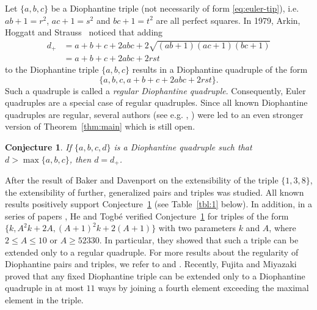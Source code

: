 \documentclass{amsart}
\newtheorem{conjecture}{Conjecture}
\theoremstyle{definition}
\begin{document}
Let $\{a,b,c\}$ be a Diophantine triple (not necessarily of form \eqref{eq:euler-tip}), i.e. $ab+1=r^2$, $ac+1=s^2$ and $bc+1=t^2$ are all perfect squares.
In 1979, Arkin, Hoggatt and Strauss~\cite{Arkin-Hoggatt-Strauss:1979} noticed that adding  
\begin{equation*}
\begin{split}
d_{+}&=a+b+c+2abc+2\sqrt{(ab+1)(ac+1)(bc+1)}\\
& = a+b+c+2abc+2rst
\end{split}
\end{equation*}
 to the Diophantine triple $\{a,b,c\}$ results in a Diophantine quadruple of the form
\begin{equation*}
\{a,b,c, a+b+c+2abc+2rst\}.
\end{equation*} 
Such a quadruple is called a \emph{regular Diophantine quadruple}. Consequently, Euler quadruples are a special case of regular quadruples.
Since all known Diophantine quadruples are regular, several authors (see e.g. \cite{Arkin-Hoggatt-Strauss:1979}, \cite{Dujella-Pethoe:1998})
were led to an even stronger version of Theorem~\ref{thm:main} which is still open.

\begin{conjecture}\label{conj:2}
 If $\{a, b, c, d\}$ is a Diophantine quadruple such that $d > \max\{a, b, c\}$, then $d = d_+$.
\end{conjecture}

 After the result of Baker and Davenport on the extensibility of the triple $\{1,3,8\}$, the extensibility of further, generalized pairs and triples was studied.
 All known results positively support Conjecture~\ref{conj:2} (see Table~\ref{tbl:1} below). In addition, in a series of papers \cite{He-Togbe:1,He-Togbe:2,He-Togbe:3}, He and Togb\'e verified Conjecture~\ref{conj:2} for triples of the form $\{k,A^2k+2A, (A+1)^2k+2(A+1)\}$ with two parameters $k$ and $A$, where $2\le A\le 10$ or $A\ge 52330$. In particular, they showed that such a triple can be extended only to a regular quadruple. For more results about the regularity of Diophantine pairs and triples, we refer to \cite{Dujella:1999} and \cite{FFT1}. Recently, Fujita and Miyazaki~\cite{Fujita-Miyazaki} proved that any fixed Diophantine triple can be extended only to a Diophantine quadruple in at most $11$ ways by joining a fourth element exceeding the maximal element in the triple.
 
\end{document}
